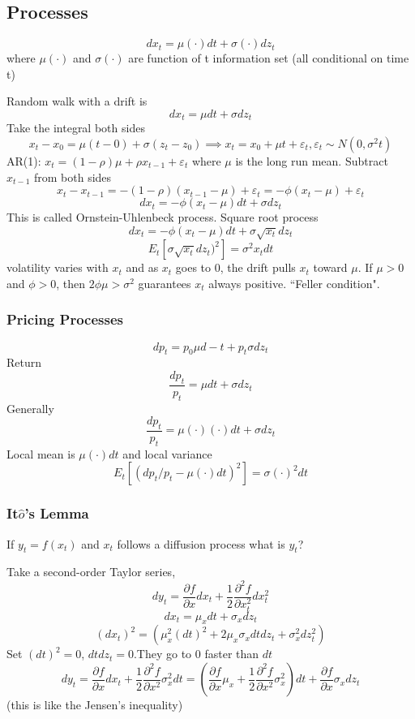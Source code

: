 \documentclass[11pt, a4paper, oneside]{article}
\theoremstyle{definition}
\theoremstyle{proposition}
\theoremstyle{corollary}
\theoremstyle{lemma}
\theoremstyle{theorem}
\begin{document}
 \subsection{Processes}
 
$$dx_t = \mu(\cdot) dt + \sigma(\cdot) dz_t$$ 
where $\mu(\cdot)$ and $\sigma(\cdot)$ are function of t information set (all conditional on time t) 

Random walk with a drift is
$$d x_t = \mu dt + \sigma dz_t$$
Take the integral both sides
$$x_t - x_0 = \mu(t-0) + \sigma(z_t - z_0) \implies x_t = x_0 + \mu t + \varepsilon_t, \varepsilon_t\sim N(0, \sigma^2 t)$$
AR(1): $x_t = (1- \rho) \mu + \rho x_{t-1} + \varepsilon_t$ where $\mu$ is the long run mean. Subtract $x_{t -1}$ from both sides 
$$x_t - x_{t-1} = - (1- \rho)(x_{t -1} - \mu) + \varepsilon_t = -\phi (x_t - \mu)+\varepsilon_t$$
$$dx_t = -\phi(x_t - \mu)dt + \sigma dz_t$$ This is called Ornstein-Uhlenbeck process. 
Square root process 
$$dx_t = -\phi(x_t -\mu) dt + \sigma \sqrt{x_t}dz_t$$
$$E_t[\sigma\sqrt{x_t}dz_t)^2] = \sigma^2 x_t dt$$
volatility varies with $x_t$ and as $x_t$ goes to 0, the drift pulls $x_t$ toward $\mu$. If $\mu> 0$ and $\phi > 0$, then $2\phi\mu > \sigma^2$ guarantees $x_t$ always positive. ``Feller condition". 

\subsubsection{Pricing Processes}
$$dp_t = p_0 \mu d-t + p_t \sigma d z_t$$
Return 
$$\frac{d p_t}{p_t} = \mu dt + \sigma dz_t$$
Generally
$$\frac{d p_t}{p_t} = \mu(\cdot)(\cdot) dt + \sigma dz_t$$
Local mean is $\mu(\cdot)dt$ and local variance $$E_t[(d p_t /p_t - \mu(\cdot) dt)^2] = \sigma(\cdot)^2dt$$

\subsubsection{It$\hat{o}$'s Lemma}
If $y_t= f(x_t)$ and $x_t$ follows a diffusion process what is $y_t$?

Take a second-order Taylor series, $$dy_t = \frac{\partial f}{\partial x} d x_t + \frac{1}{2} \frac{\partial^2 f}{\partial x_t^2} dx_t^2$$
$$dx_t = \mu_x dt + \sigma_x dz_t$$
$$(dx_t)^2 = (\mu_x^2(dt)^2 + 2\mu_x \sigma_x dt dz_t + \sigma_x^2dz_t^2)$$
Set $(dt)^2= 0$, $dtdz_t = 0$.They go to 0 faster than $dt$ 
$$dy_t = \frac{\partial f}{\partial x} dx_t + \frac{1}{2} \frac{\partial^2  f}{\partial x^2} \sigma_x^2dt=(\frac{\partial f}{\partial x}\mu_x + \frac{1}{2}\frac{\partial^2 f}{\partial x^2}\sigma_x^2)dt + \frac{\partial f}{\partial x} \sigma_x dz_t$$ (this is like the Jensen's inequality)
\end{document}
